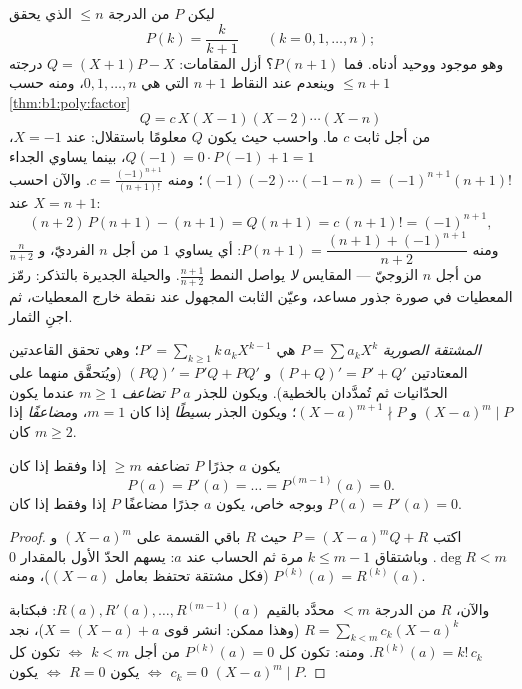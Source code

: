 \begin{example}\label{ex:b1:poly:auxiliary}
ليكن $P$  من الدرجة $\leq n$ الذي يحقق
\[
P(k) = \frac{k}{k+1} \qquad (k = 0, 1, \dots, n) ;
\]
وهو موجود ووحيد  أدناه. فما
$P(n+1)$؟ أزل المقامات:  $Q = (X+1)P - X$
درجته $\leq n + 1$ وينعدم عند النقاط $n + 1$ التي هي $0, 1,
\dots, n$، ومنه حسب \cref{thm:b1:poly:factor}
\[
Q = c\,X(X-1)(X-2)\cdots(X-n)
\]
من أجل ثابت $c$ ما. واحسب حيث يكون $Q$ معلومًا باستقلال:
عند $X = -1$، $Q(-1) = 0 \cdot P(-1) + 1 = 1$، بينما يساوي الجداء
$(-1)(-2)\cdots(-1-n) = (-1)^{n+1}(n+1)!$؛ ومنه $c =
\frac{(-1)^{n+1}}{(n+1)!}$. والآن احسب عند $X = n + 1$:
\[
(n+2)\,P(n+1) - (n+1) = Q(n+1) = c\,(n+1)! = (-1)^{n+1} ,
\]
ومنه $P(n+1) = \dfrac{(n+1) + (-1)^{n+1}}{n+2}$: أي يساوي $1$ من أجل
$n$ الفرديّ، و $\frac{n}{n+2}$ من أجل $n$ الزوجيّ --- 
المقايس \emph{لا} يواصل النمط
$\frac{n+1}{n+2}$. والحيلة الجديرة بالتذكر: رمّز المعطيات في صورة
جذور  مساعد، وعيّن الثابت المجهول
عند نقطة خارج المعطيات، ثم اجنِ الثمار.
\end{example}

\begin{definition}\label{def:b1:poly:derivative}
\emph{المشتقة الصورية}  $P = \sum a_k X^k$ هي $P' = \sum_{k
\geq 1} k\,a_k X^{k-1}$؛ وهي تحقق القاعدتين المعتادتين $(P+Q)' = P' +
Q'$ و $(PQ)' = P'Q + PQ'$ (ويُتحقَّق منهما على الحدّانيات ثم تُمدَّدان
بالخطية). ويكون للجذر $a$  $P$
\emph{تضاعف} $m \geq 1$ عندما يكون
$(X-a)^m \mid P$ و $(X-a)^{m+1} \nmid P$؛ ويكون الجذر \emph{بسيطًا}
إذا كان $m = 1$، و\emph{مضاعفًا} إذا كان $m \geq 2$.
\end{definition}

\begin{proposition}\label{prop:b1:poly:multiplicity}
يكون $a$ جذرًا  $P$ تضاعفه $\geq m$ إذا وفقط إذا كان
\[
P(a) = P'(a) = \dots = P^{(m-1)}(a) = 0 .
\]
وبوجه خاص، يكون $a$ جذرًا مضاعفًا  $P$ إذا وفقط إذا كان $P(a) =
P'(a) = 0$.
\end{proposition}

\begin{proof}
اكتب $P = (X - a)^m Q + R$ حيث $R$ باقي القسمة
على $(X-a)^m$ و $\deg R < m$. وباشتقاق $k \leq m - 1$ مرة ثم
الحساب عند $a$: يسهم الحدّ الأول بالمقدار $0$ (فكل مشتقة
تحتفظ بعامل $(X-a)$)، ومنه $P^{(k)}(a) = R^{(k)}(a)$.

والآن،  $R$ من الدرجة $< m$ محدَّد بالقيم $R(a), R'(a),
\dots, R^{(m-1)}(a)$: فبكتابة $R = \sum_{k < m} c_k (X - a)^k$
(وهذا ممكن: انشر قوى $X = (X - a) + a$)، نجد
$R^{(k)}(a) = k!\, c_k$. ومنه: تكون كل $P^{(k)}(a) = 0$ من أجل $k < m$
$\iff$ تكون كل $c_k = 0$ $\iff$ يكون $R = 0$ $\iff$ يكون $(X-a)^m \mid P$.
\end{proof}

